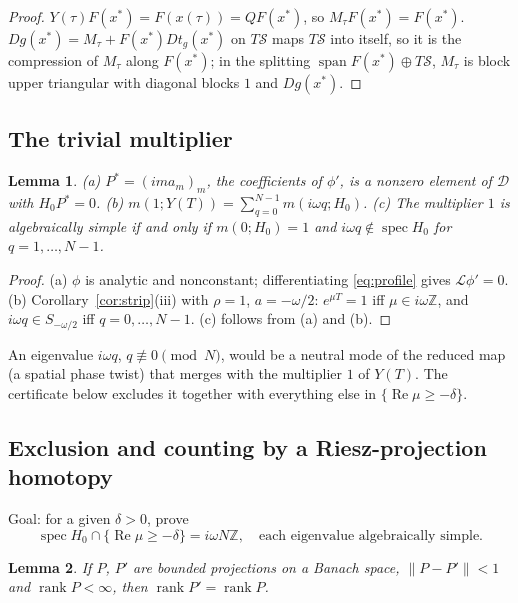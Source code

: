 \documentclass[11pt]{article}
\newtheorem{lemma}{Lemma}[section]
\theoremstyle{definition}
\newcommand{\Z}{\mathbb{Z}}
\newcommand{\re}{\operatorname{Re}}
\newcommand{\spec}{\operatorname{spec}}
\newcommand{\rank}{\operatorname{rank}}
\newcommand{\Dsp}{\mathcal{D}}
\newcommand{\Lop}{\mathcal{L}}
\begin{document}
\begin{proof}
$Y(\tau)F(x^*) = F(x(\tau)) = QF(x^*)$, so $M_\tau F(x^*) = F(x^*)$. $Dg(x^*) = M_\tau + F(x^*)Dt_g(x^*)$ on $T\mathcal S$ maps $T\mathcal S$ into itself, so it is the compression of $M_\tau$ along $F(x^*)$; in the splitting $\operatorname{span}F(x^*) \oplus T\mathcal S$, $M_\tau$ is block upper triangular with diagonal blocks $1$ and $Dg(x^*)$.
\end{proof}

\subsection{The trivial multiplier}\label{sec:trivial}

\begin{lemma}\label{lem:trivial}
(a) $P^* = (ima_m)_m$, the coefficients of $\phi'$, is a nonzero element of $\Dsp$ with $H_0P^* = 0$. (b) $m(1; Y(T)) = \sum_{q=0}^{N-1}m(i\omega q; H_0)$. (c) The multiplier $1$ is algebraically simple if and only if $m(0; H_0) = 1$ and $i\omega q \notin \spec H_0$ for $q = 1, \dots, N - 1$.
\end{lemma}

\begin{proof}
(a) $\phi$ is analytic and nonconstant; differentiating \eqref{eq:profile} gives $\Lop\phi' = 0$. (b) Corollary~\ref{cor:strip}(iii) with $\rho = 1$, $a = -\omega/2$: $e^{\mu T} = 1$ iff $\mu \in i\omega\Z$, and $i\omega q \in S_{-\omega/2}$ iff $q = 0, \dots, N-1$. (c) follows from (a) and (b).
\end{proof}

An eigenvalue $i\omega q$, $q \not\equiv 0 \pmod N$, would be a neutral mode of the reduced map (a spatial phase twist) that merges with the multiplier $1$ of $Y(T)$. The certificate below excludes it together with everything else in $\{\re\mu \ge -\delta\}$.

\subsection{Exclusion and counting by a Riesz-projection homotopy}\label{sec:riesz}

Goal: for a given $\delta > 0$, prove
\begin{equation}\label{eq:G}
  \spec H_0 \cap \{\re\mu \ge -\delta\} = i\omega N\Z, \quad\text{each eigenvalue algebraically simple.}
\end{equation}

\begin{lemma}\label{lem:projrank}
If $P$, $P'$ are bounded projections on a Banach space, $\|P - P'\| < 1$ and $\rank P < \infty$, then $\rank P' = \rank P$.
\end{lemma}
\end{document}
